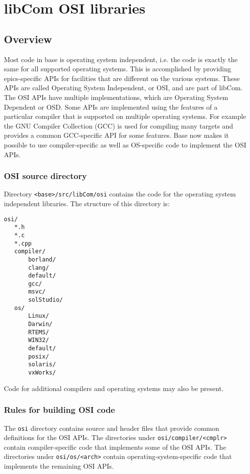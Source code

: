 \chapter{libCom OSI libraries}

\section{Overview}

Most code in base is operating system independent, i.e. the code is exactly the same for all supported operating systems. 
This is accomplished by providing epics-specific APIs for facilities that are different on the various systems.
These APIs are called Operating System Independent, or OSI, and are part of libCom.
The OSI APIs have multiple implementations, which are Operating System Dependent or OSD.
Some APIs are implemented using the features of a particular compiler that is supported on multiple operating systems.
For example the GNU Compiler Collection (GCC) is used for compiling many targets and provides a common GCC-specific API for some features.
Base now makes it possible to use compiler-specific as well as OS-specific code to implement the OSI APIs.

\subsection{OSI source directory}

Directory \verb|<base>/src/libCom/osi| contains the code for the operating system independent libraries.
The structure of this directory is:

\begin{verbatim}
osi/
   *.h
   *.c
   *.cpp
   compiler/
       borland/
       clang/
       default/
       gcc/
       msvc/
       solStudio/
   os/
       Linux/
       Darwin/
       RTEMS/
       WIN32/
       default/
       posix/
       solaris/
       vxWorks/
\end{verbatim}

Code for additional compilers and operating systems may also be present.

\subsection{Rules for building OSI code}

The \verb|osi| directory contains source and header files that provide common definitions for the OSI APIs.
The directories under \verb|osi/compiler/<cmplr>| contain compiler-specific code that implements some of the OSI APIs.
The directories under \verb|osi/os/<arch>| contain operating-system-specific code that implements the remaining OSI APIs.

